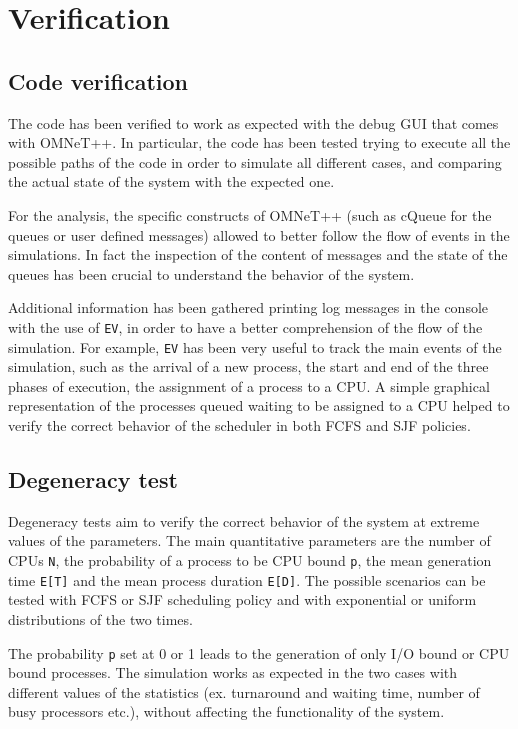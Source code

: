 \chapter{Verification}

\section{Code verification}
The code has been verified to work as expected with the debug GUI that comes 
with OMNeT++. In particular, the code has been tested trying to execute all the 
possible paths of the code in order to simulate all different cases, and comparing 
the actual state of the system with the expected one.

For the analysis, the specific constructs of OMNeT++ (such as cQueue for the queues 
or user defined messages) allowed to better follow the flow of events in the simulations.
In fact the inspection of the content of messages and the state of the queues has been 
crucial to understand the behavior of the system.

Additional information has been gathered printing log messages in the console with the 
use of \texttt{EV}, in order to have a better comprehension of the flow of the simulation.
For example, \texttt{EV} has been very useful to track the main events of the 
simulation, such as the arrival of a new process, the start and end of the three phases 
of execution, the assignment of a process to a CPU. 
A simple graphical representation of the processes queued waiting to be assigned to a 
CPU helped to verify the correct behavior of the scheduler in both FCFS and SJF policies.

\section{Degeneracy test}
Degeneracy tests aim to verify the correct behavior of the system at extreme 
values of the parameters. The main quantitative parameters are the number of CPUs 
\texttt{N}, the probability of a process to be CPU bound \texttt{p}, the mean generation time
\texttt{E[T]} and the mean process duration \texttt{E[D]}. The possible scenarios
can be tested with FCFS or SJF scheduling policy and with exponential or uniform 
distributions of the two times.

The probability \texttt{p} set at 0 or 1 leads to the generation of
only I/O bound or CPU bound processes. The simulation works as expected in the 
two cases with different values of the statistics (ex. turnaround and waiting time, 
number of busy processors etc.), without affecting the functionality of the system.

